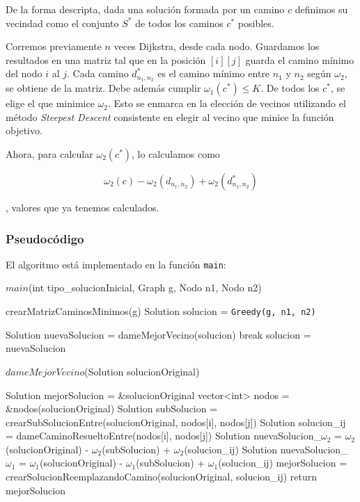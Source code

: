 De la forma descripta, dada una solución formada por un camino $c$ definimos su vecindad como el conjunto $S^*$ de todos los caminos $c^*$ posibles.

Corremos previamente $n$ veces Dijkstra, desde cada nodo. Guardamos los resultados en una matriz tal que en la posición $[i][j]$ guarda el camino mínimo del nodo $i$ al $j$. Cada camino $d_{n_1,n_2}^*$ es el camino mínimo entre $n_1$ y $n_2$ según $\omega_2$, se obtiene de la matriz. Debe además cumplir $\omega_1(c^*) \leq K$. De todos los $c^*$, se elige el que minimice $\omega_2$. Esto se enmarca en la elección de vecinos utilizando el método \textit{Steepest Descent} consistente en elegir al vecino que minice la función objetivo.

Ahora, para calcular $\omega_2(c^*)$, lo calculamos como

\[
\omega_2(c) - \omega_2(d_{n_1,n_2}) + \omega_2(d_{n_1,n_2}^*)
\]

, valores que ya tenemos calculados.

\subsubsection{Pseudocódigo}

El algoritmo está implementado en la función \texttt{main}:

\begin{algorithm}[H]
\caption{$main$(int tipo\_solucionInicial, Graph g, Nodo n1, Nodo n2)}
\begin{algorithmic}[1]
  \State crearMatrizCaminosMinimos(g)
  \State Solution solucion = \texttt{Greedy(g, n1, n2)}
  
    	\State Solution nuevaSolucion = dameMejorVecino(solucion)
		\State break	
	\EndIf    
	\State solucion = nuevaSolucion	
    \EndWhile
  \EndIf
\end{algorithmic}
\end{algorithm}

\begin{algorithm}[H]
\caption{$dameMejorVecino$(Solution solucionOriginal)}
\begin{algorithmic}[1]	
          \State Solution mejorSolucion = \&solucionOriginal
	  \State vector<int> nodos = \&nodos(solucionOriginal)
			\State Solution subSolucion = crearSubSolucionEntre(solucionOriginal, nodos[i], nodos[j])
			\State Solution solucion\_ij = dameCaminoResueltoEntre(nodos[i], nodos[j])
			\State Solution nuevaSolucion\_$\omega_2$ = $\omega_2$(solucionOriginal) - $\omega_2$(subSolucion) + $\omega_2$(solucion\_ij)
			\State Solution nuevaSolucion\_$\omega_1$ = $\omega_1$(solucionOriginal) - $\omega_1$(subSolucion) + $\omega_1$(solucion\_ij)			
				\State mejorSolucion = crearSolucionReemplazandoCamino(solucionOriginal, solucion\_ij)
			\EndIf
		\EndFor
	\EndFor
	\State return mejorSolucion
\end{algorithmic}
\end{algorithm}

